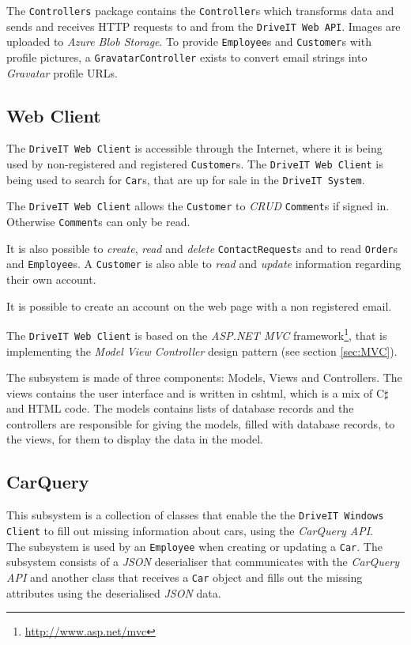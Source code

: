 The \texttt{Controllers} package contains the \texttt{Controller}s which transforms data and sends and receives HTTP requests to and from the \texttt{DriveIT Web API}. Images are uploaded to \textit{Azure Blob Storage}. To provide \texttt{Employee}s and \texttt{Customer}s with profile pictures, a \texttt{GravatarController} exists to convert email strings into \textit{Gravatar} profile URLs.

\subsection{Web Client}
The \texttt{DriveIT Web Client} is accessible through the Internet, where it is being used by non-registered and registered \texttt{Customer}s. The \texttt{DriveIT Web Client} is being used to search for \texttt{Car}s, that are up for sale in the \texttt{DriveIT System}.

The \texttt{DriveIT Web Client} allows the \texttt{Customer} to \textit{CRUD} \texttt{Comment}s if signed in. Otherwise \texttt{Comment}s can only be read.

It is also possible to \textit{create}, \textit{read} and \textit{delete} \texttt{ContactRequest}s and to read \texttt{Order}s and \texttt{Employee}s. A \texttt{Customer} is also able to \textit{read} and \textit{update} information regarding their own account.

It is possible to create an account on the web page with a non registered email.

The \texttt{DriveIT Web Client} is based on the \textit{ASP.NET MVC} framework\footnote{\url{http://www.asp.net/mvc}}, that is implementing the \textit{Model View Controller} design pattern (see section \ref{sec:MVC}).

The subsystem is made of three components: Models, Views and Controllers. The views contains the user interface and is written in cshtml, which is a mix of C$\sharp$ and HTML code. The models contains lists of database records and the controllers are responsible for giving the models, filled with database records, to the views, for them to display the data in the model.

\subsection{CarQuery} 
This subsystem is a collection of classes that enable the the \texttt{DriveIT Windows Client} to fill out missing information about cars, using the \textit{CarQuery API}.\\
The subsystem is used by an \texttt{Employee} when creating or updating a \texttt{Car}. The subsystem consists of a \textit{JSON} deserialiser that communicates with the \textit{CarQuery API} and another class that receives a \texttt{Car} object and fills out the missing attributes using the deserialised \textit{JSON} data.

